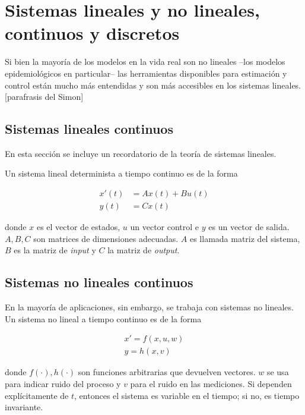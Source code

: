 
\chapter{Sistemas lineales y no lineales, continuos y discretos} \label{sec:lineal}

Si bien la mayoría de los modelos en la vida real son no lineales --los modelos epidemiológicos en particular-- las herramientas disponibles para estimación y control están mucho más entendidas y son más accesibles en los sistemas lineales. [parafrasis del Simon]


\section{Sistemas lineales continuos}

En esta sección se incluye un recordatorio de la teoría de sistemas lineales. 

Un sistema lineal determinista a tiempo continuo es de la forma 

\[
\begin{aligned}
x'(t) &= Ax(t) + Bu(t) \\
y(t) &= Cx(t)
\end{aligned}
\]

donde \(x\) es el vector de estados, \(u\) un vector control e \(y\) es un vector de salida. \(A, B, C\) son matrices de dimensiones adecuadas. \(A\) es llamada matriz del sistema, \(B\) es la matriz de \textit{input} y \(C\) la matriz de \textit{output}.\\





\section{Sistemas no lineales continuos}


En la mayoría de aplicaciones, sin embargo, se trabaja con sistemas no lineales. Un sistema no lineal a tiempo continuo es de la forma 

\[
\begin{aligned}
x' = f(x,u,w) \\
y = h(x,v)
\end{aligned}
\]

donde \(f(\cdot), h(\cdot)\) son funciones arbitrarias que devuelven vectores. \(w\) se usa para indicar ruido del proceso y \(v\) para el ruido en las mediciones. Si dependen explícitamente de \(t\), entonces el sistema es variable en el tiempo; si no, es tiempo invariante. 

